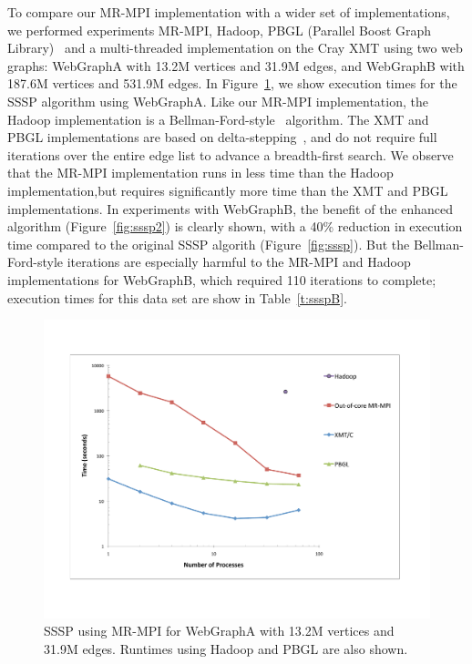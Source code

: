 To compare our MR-MPI implementation with a wider set of implementations,
we performed experiments MR-MPI, Hadoop, PBGL (Parallel
Boost Graph Library)~\cite{PBGL} and a multi-threaded implementation on the
Cray XMT using two web graphs: {WebGraphA} with 13.2M
vertices and 31.9M edges, and {WebGraphB} with 187.6M vertices and 531.9M edges.
In Figure~\ref{f:ssspA}, we show execution times for the SSSP algorithm
using {WebGraphA}.   Like our MR-MPI implementation, the Hadoop 
implementation is a Bellman-Ford-style~\cite{Bellman58,Ford62}  algorithm.  
The XMT and PBGL implementations are based on 
delta-stepping~\cite{MeyerSanders98}, and do not require full iterations
over the entire edge list to advance a breadth-first search.  
We observe that the MR-MPI
implementation runs in less time than the Hadoop implementation,but requires
significantly more time than the XMT and PBGL implementations.  
In experiments with {WebGraphB},
the benefit of the enhanced algorithm (Figure~\ref{fig:sssp2}) is clearly
shown, with a 40\% reduction in execution time compared to the original
SSSP algorith (Figure~\ref{fig:sssp}).
But the Bellman-Ford-style iterations are especially harmful to the MR-MPI and
Hadoop implementations for {WebGraphB}, which required 110 iterations to 
complete; execution times for this data set are show in Table~\ref{t:ssspB}.

\begin{figure}[htb]
\includegraphics[width=\textwidth]{fig_ssspA.pdf}
\caption{SSSP using MR-MPI for WebGraphA with
13.2M vertices and 31.9M edges.  Runtimes using Hadoop and PBGL
are also shown.}
\label{f:ssspA}
\end{figure}

